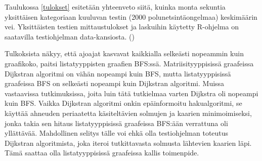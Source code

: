 Taulukossa \ref{tulokset} esitetään yhteenveto siitä, kuinka monta sekuntia 
yksittäisen kategoriaan kuuluvan testin (2000 polunetsintäongelmaa) 
keskimäärin vei. Yksittäisten testien mittaustulokset ja laskuihin käytetty 
R-ohjelma on saatavilla testiohjelman data-kansiosta. (\cite{gt2}) \par
	Tulkoksista näkyy, että ajoajat kasvavat kaikkialla selkeästi 
nopeammin kuin graafikoko, paitsi listatyyppisten graafien BFS:ssä. 
Matriisityyppisissä graafeissa Dijkstran algoritmi on vähän nopeampi kuin 
BFS, mutta listatyyppisissä graafeissa BFS on selkeästi nopeampi kuin 
Dijkstran algoritmi. Muissa vastaavissa tutkimuksissa, joita luin tätä 
tutkielmaa varten Dijkstra oli nopeampi kuin BFS.\cite{mazeGameTrilogi} 
Vaikka Dijkstran algoritmi onkin epäinformoitu hakualgoritmi\cite{arXivMAPF}, 
se käyttää ahneuden periaatetta käsiteltävien solmujen ja kaarien 
minimoimiseksi\cite{mazeGameTrilogi}, jonka takia sen hitaus listatyyppisissä 
graafeissa BFS:ään verrattuna oli yllättävää. Mahdollinen selitys tälle voi 
ehkä olla testiohjelman toteutus Dijkstran algoritmista, joka iteroi 
tutkittavasta solmusta lähtevien kaarien läpi.\cite{gt2} Tämä saattaa olla 
listatyyppisissä graafeissa kallis toimenpide.

